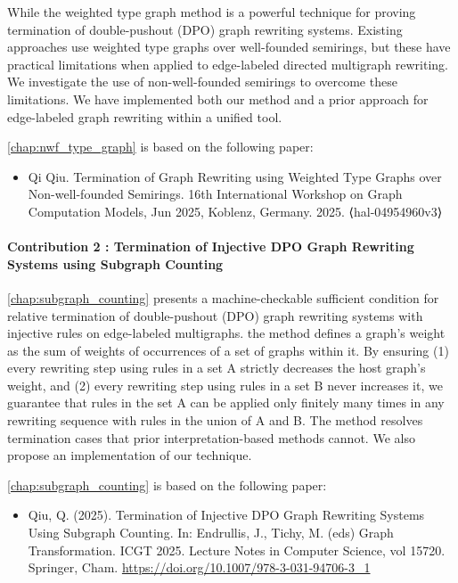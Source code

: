 While the weighted type graph method is a powerful technique for proving termination of double-pushout (DPO) graph rewriting systems. 
Existing approaches use weighted type graphs over well-founded semirings, but these have practical limitations when applied to edge-labeled directed multigraph rewriting.
We investigate the use of non-well-founded semirings to overcome these limitations.
We have implemented both our method and a prior approach for edge-labeled graph rewriting within a unified tool.

\autoref{chap:nwf_type_graph} is based on the following paper:
\begin{itemize}
    \item Qi Qiu. Termination of Graph Rewriting using Weighted Type Graphs over Non-well-founded Semirings. 16th International Workshop on Graph Computation Models, Jun 2025, Koblenz, Germany. 2025. ⟨hal-04954960v3⟩
\end{itemize}
 
\paragraph{Contribution 2 : Termination of Injective DPO Graph Rewriting Systems using Subgraph Counting} 

\autoref{chap:subgraph_counting} presents a machine-checkable sufficient condition for relative termination of double-pushout (DPO) graph rewriting systems with injective rules on edge-labeled multigraphs. 
the method defines a graph's weight as the sum of weights of occurrences of a set of graphs within it. By ensuring 
(1) every rewriting step using rules in a set A strictly decreases the host graph's weight, and 
(2) every rewriting step using rules in a set B never increases it, we guarantee that rules in the set A can be applied only finitely many times in any rewriting sequence with rules in the union of A and B.  
The method resolves termination cases that prior interpretation-based methods cannot. 
We also propose an implementation of our technique.

\autoref{chap:subgraph_counting} is based on the following paper:
\begin{itemize}
    \item Qiu, Q. (2025). Termination of Injective DPO Graph Rewriting Systems Using Subgraph Counting. In: Endrullis, J., Tichy, M. (eds) Graph Transformation. ICGT 2025. Lecture Notes in Computer Science, vol 15720. Springer, Cham. \url{https://doi.org/10.1007/978-3-031-94706-3_1}
\end{itemize}
